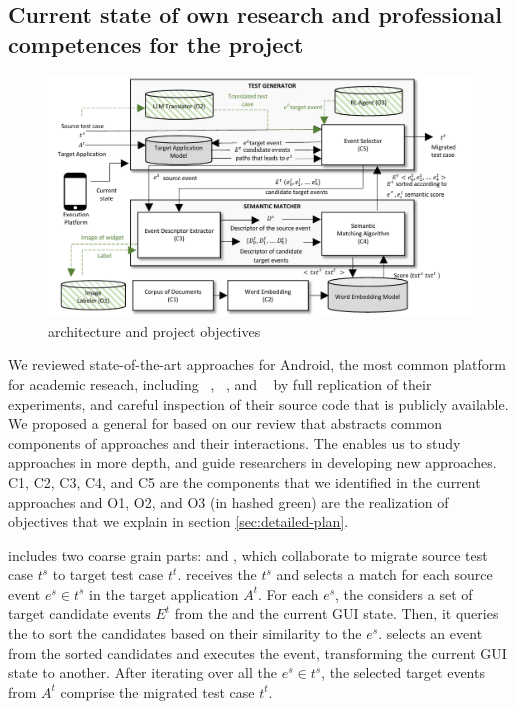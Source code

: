 	
\subsection{Current state of own research and professional competences for the project}
\label{sec:own-research}

\begin{figure}[h]
	\centering
	\includegraphics[width=\textwidth]{images/architecture.pdf}
	\caption{\testreuse architecture and project objectives}
	\label{fig:architecture}
\end{figure}

We reviewed state-of-the-art \testreuse approaches for Android, the most common platform for academic reseach, including \atm~\cite{behrang:apptestmigrator:ASE:2019}, \craftdroid~\cite{lin:craftdroid:ASE:2019}, and \adaptdroid~\cite{Mariani:Adaptdroid:AST:2021} by full replication of their experiments, and careful inspection of their source code that is publicly available.
We proposed a general \architecture for \testreuse based on our review that abstracts common components of \testreuse approaches and their interactions. 
The \architecture enables us to study \testreuse approaches in more depth, and guide researchers in developing new approaches.
C1, C2, C3, C4, and C5 are the components that we identified in the current approaches and O1, O2, and O3 (in hashed green) are the realization of \project objectives that we explain in section \ref{sec:detailed-plan}. 


\smallskip 
\testreuse  includes two coarse grain parts: \generator and \matcher, which collaborate to migrate source test case $t^s$ to target test case $t^t$.
\generator receives the $t^s$ and selects a match for each source event $e^s \in t^s$ in the target application $A^t$.
For each $e^s$, the \generator considers a set of target candidate events $E^t$ from the \tam and the current GUI state. 
Then, it queries the \matcher to sort the candidates based on their similarity to the $e^s$.
\generator selects an event from the sorted candidates and executes the event, transforming the current GUI state to another. 
After iterating over all the $e^s \in t^s$, the selected target events from $A^t$ comprise the migrated test case $t^t$. 




